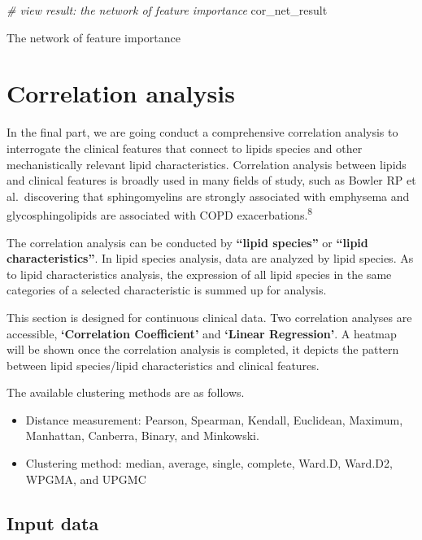 \documentclass[]{article}
\providecommand{\tightlist}{%
  \setlength{\itemsep}{0pt}\setlength{\parskip}{0pt}}
\newcommand{\hlcom}[1]{\textcolor[rgb]{0.502,0.502,0.502}{\textit{#1}}}%
\newcommand{\hlstd}[1]{\textcolor[rgb]{0.251,0.251,0.251}{#1}}%
\newenvironment{Shaded}{\begin{myshaded}}{\end{myshaded}}
\newcommand{\CommentTok}[1]{\hlcom{#1}}
\newcommand{\NormalTok}[1]{\hlstd{#1}}
\begin{document}
\begin{Shaded}
\begin{Highlighting}[]
\CommentTok{# view result: the network of feature importance}
\NormalTok{cor_net_result  }
\end{Highlighting}
\end{Shaded}

\label{fig:unnamed-chunk-69}The network of feature importance

\hypertarget{corr}{%
\section{Correlation analysis}\label{corr}}

In the final part, we are going conduct a comprehensive correlation analysis to interrogate the clinical features that connect to lipids species and other mechanistically relevant lipid characteristics. Correlation analysis between lipids and clinical features is broadly used in many fields of study, such as Bowler RP et al.~discovering that sphingomyelins are strongly associated with emphysema and glycosphingolipids are associated with COPD exacerbations.\textsuperscript{8}

The correlation analysis can be conducted by \textbf{``lipid species''} or \textbf{``lipid characteristics''}. In lipid species analysis, data are analyzed by lipid species. As to lipid characteristics analysis, the expression of all lipid species in the same categories of a selected characteristic is summed up for analysis.

This section is designed for continuous clinical data. Two correlation analyses are accessible, \textbf{`Correlation Coefficient'} and \textbf{`Linear Regression'}. A heatmap will be shown once the correlation analysis is completed, it depicts the pattern between lipid species/lipid characteristics and clinical features.

The available clustering methods are as follows.

\begin{itemize}
\tightlist
\item
  Distance measurement: Pearson, Spearman, Kendall, Euclidean, Maximum, Manhattan, Canberra, Binary, and Minkowski.
\item
  Clustering method: median, average, single, complete, Ward.D, Ward.D2, WPGMA, and UPGMC
\end{itemize}

\hypertarget{input-data-3}{%
\subsection{Input data}\label{input-data-3}}
\end{document}
